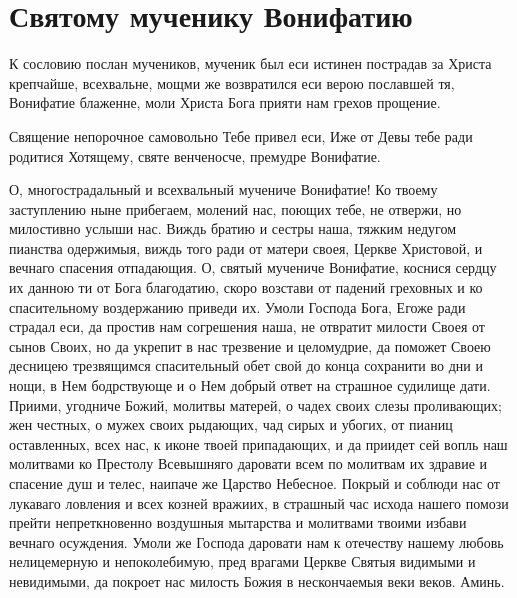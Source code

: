 \section{Святому мученику Вонифатию}\begin{mymulticols}


К сословию послан мучеников, мученик был еси истинен пострадав за Христа крепчайше, всехвальне, мощми же возвратился еси верою пославшей тя, Вонифатие блаженне, моли Христа Бога прияти нам грехов прощение.


Священие непорочное самовольно Тебе привел еси, Иже от Девы тебе ради родитися Хотящему, святе венченосче, премудре Вонифатие.


О, многострадальный и всехвальный мучениче Вонифатие! Ко твоему заступлению ныне прибегаем, молений нас, поющих тебе, не отвержи, но милостивно услыши нас. Виждь братию и сестры наша, тяжким недугом пианства одержимыя, виждь того ради от матери своея, Церкве Христовой, и вечнаго спасения отпадающия. О, святый мучениче Вонифатие, коснися сердцу их данною ти от Бога благодатию, скоро возстави от падений греховных и ко спасительному воздержанию приведи их. Умоли Господа Бога, Егоже ради страдал еси, да простив нам согрешения наша, не отвратит милости Своея от сынов Своих, но да укрепит в нас трезвение и целомудрие, да поможет Своею десницею трезвящимся спасительный обет свой до конца сохранити во дни и нощи, в Нем бодрствующе и о Нем добрый ответ на страшное судилище дати. Приими, угодниче Божий, молитвы матерей, о чадех своих слезы проливающих; жен честных, о мужех своих рыдающих, чад сирых и убогих, от пианиц оставленных, всех нас, к иконе твоей припадающих, и да приидет сей вопль наш молитвами ко Престолу Всевышняго даровати всем по молитвам их здравие и спасение душ и телес, наипаче же Царство Небесное. Покрый и соблюди нас от лукаваго ловления и всех козней вражиих, в страшный час исхода нашего помози прейти непреткновенно воздушныя мытарства и молитвами твоими избави вечнаго осуждения. Умоли же Господа даровати нам к отечеству нашему любовь нелицемерную и непоколебимую, пред врагами Церкве Святыя видимыми и невидимыми, да покроет нас милость Божия в нескончаемыя веки веков. Аминь.

\end{mymulticols}

